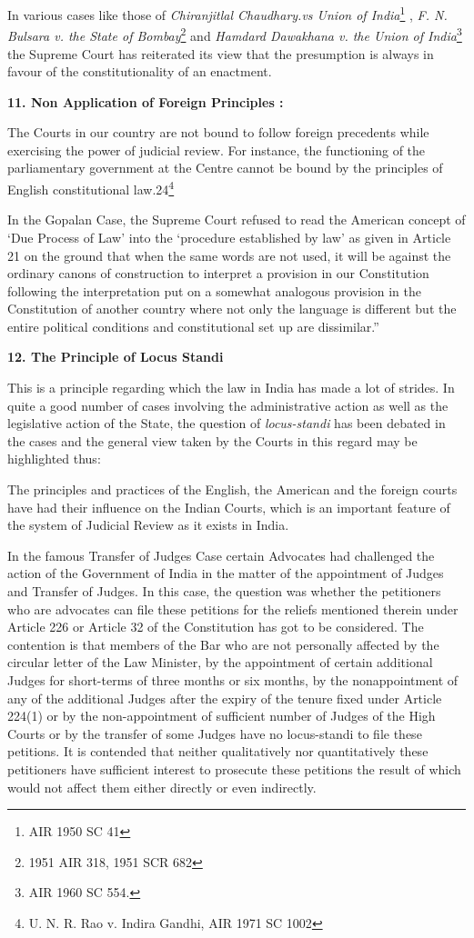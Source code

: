 \begin{multicols}{2}
\noi
In various cases like those of \textit{Chiranjitlal Chaudhary.vs Union of India}\footnote{AIR 1950 SC 41}
, \textit{F. N. Bulsara
v. the State of Bombay}\footnote{ 1951 AIR 318, 1951 SCR 682} and \textit{Hamdard Dawakhana v. the Union of India}\footnote{AIR 1960 SC 554.} the Supreme
Court has reiterated its view that the presumption is always in favour of the
constitutionality of an enactment.

\noi
{\bf 11. Non Application of Foreign Principles :}

\noi
The Courts in our country are not bound to follow foreign precedents while exercising
the power of judicial review. For instance, the functioning of the parliamentary
government at the Centre cannot be bound by the principles of English constitutional
law.24\footnote{ U. N. R. Rao v. Indira Gandhi, AIR 1971 SC 1002}

\noi
In the Gopalan Case, the Supreme Court refused to read the American concept of ‘Due
Process of Law’ into the ‘procedure established by law’ as given in Article 21 on the
ground that when the same words are not used, it will be against the ordinary canons of
construction to interpret a provision in our Constitution following the interpretation put
on a somewhat analogous provision in the Constitution of another country where not
only the language is different but the entire political conditions and constitutional set
up are dissimilar.”

\noi
{\bf 12. The Principle of Locus Standi}

\noi
This is a principle regarding which the law in India has made a lot of strides. In quite a
good number of cases involving the administrative action as well as the legislative
action of the State, the question of \textit{locus-standi} has been debated in the cases and the
general view taken by the Courts in this regard may be highlighted thus:

\noi
The principles and practices of the English, the American and the foreign courts have
had their influence on the Indian Courts, which is an important feature of the system of
Judicial Review as it exists in India.

\noi
In the famous Transfer of Judges Case certain Advocates had challenged the action of
the Government of India in the matter of the appointment of Judges and Transfer of
Judges. In this case, the question was whether the petitioners who are advocates can file
these petitions for the reliefs mentioned therein under Article 226 or Article 32 of the
Constitution has got to be considered. The contention is that members of the Bar who
are not personally affected by the circular letter of the Law Minister, by the appointment
of certain additional Judges for short-terms of three months or six months, by the nonappointment of any of the additional Judges after the expiry of the tenure fixed under
Article 224(1) or by the non-appointment of sufficient number of Judges of the High
Courts or by the transfer of some Judges have no locus-standi to file these petitions. It
is contended that neither qualitatively nor quantitatively these petitioners have
sufficient interest to prosecute these petitions the result of which would not affect them
either directly or even indirectly.


\end{multicols}
